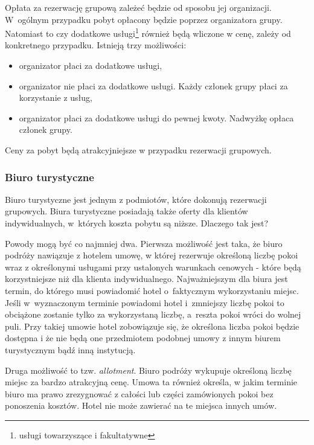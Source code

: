 \documentclass[a4paper,onecolumn,oneside,11pt,wide,floatssmall]{mwrep}
\theoremstyle{definition}
\theoremstyle{plain}%
\theoremstyle{remark}
\begin{document}
Opłata za rezerwację grupową zależeć będzie od sposobu jej organizacji. \mbox{W 
ogólnym} przypadku pobyt opłacony będzie poprzez organizatora grupy. 
Natomiast to czy dodatkowe usługi\footnote{usługi towarzyszące i fakultatywne}
 również będą wliczone w cenę, zależy od konkretnego przypadku. Istnieją trzy 
 możliwości:

\begin{itemize}
   \item organizator płaci za dodatkowe usługi,
   \item organizator nie płaci za dodatkowe usługi. Każdy członek grupy 
   płaci za korzystanie z usług,
   \item organizator płaci za dodatkowe usługi do pewnej kwoty. Nadwyżkę 
   opłaca członek grupy.
\end{itemize}

Ceny za pobyt będą atrakcyjniejsze w przypadku rezerwacji grupowych.

\subsubsection{Biuro turystyczne}
\label{biuro-turystyczne}
Biuro turystyczne jest jednym z podmiotów, które dokonują rezerwacji 
grupowych. Biura turystyczne posiadają także oferty dla klientów 
indywidualnych, \mbox{w których} koszta pobytu są niższe. Dlaczego tak jest?

Powody mogą być co najmniej dwa. Pierwsza możliwość jest taka, że biuro 
podróży nawiązuje z hotelem umowę, w której rezerwuje określoną liczbę 
pokoi wraz z określonymi usługami przy ustalonych warunkach cenowych - 
które będą korzystniejsze niż dla klienta indywidualnego. Najważniejszym dla 
biura jest termin, do którego musi powiadomić hotel \mbox{o faktycznym} 
wykorzystaniu miejsc. Jeśli \mbox{w wyznaczonym} terminie powiadomi hotel \mbox{i 
zmniejszy} liczbę pokoi to obciążone zostanie tylko za wykorzystaną liczbę, \mbox{a 
reszta} pokoi wróci do wolnej puli. Przy takiej umowie hotel zobowiązuje się, 
że określona liczba pokoi będzie dostępna i że nie będą one przedmiotem 
podobnej umowy z innym biurem turystycznym bądź inną instytucją.

Druga możliwość to tzw. \emph{allotment}. Biuro podróży wykupuje określoną 
liczbę miejsc za bardzo atrakcyjną cenę. Umowa ta również określa, w jakim 
terminie biuro ma prawo zrezygnować z całości lub części zamówionych pokoi 
bez ponoszenia kosztów. Hotel nie może zawierać na te miejsca innych umów.
\end{document}
